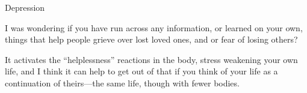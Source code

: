 \documentclass[11pt,oneside,openany,extrafontsizes]{memoir}
\begin{document}
\begin{qaexchange}{Depression}

    \begin{question}
         I was wondering if you have run across any information, or learned on your own, things that help people grieve over lost loved ones, and or fear of losing others?
    \end{question}

    \begin{answer}
      It activates the \enquote{helplessness} reactions in the body, stress weakening your own life, and I think it can help to get out of that if you think of your life as a continuation of theirs—the same life, though with fewer bodies.
    \end{answer}
\end{qaexchange}
\end{document}
